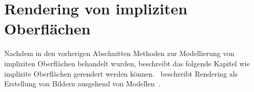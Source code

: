 
\section{Rendering von impliziten Oberflächen}
\label{sec:rendering_implicit_surfaces}

Nachdem in den vorherigen Abschnitten Methoden zur Modellierung von
impliziten Oberflächen behandelt wurden, beschreibt das folgende Kapitel
wie implizite Oberflächen gerendert werden
können.~\citeauthor{foley_computer_1996} beschreibt Rendering als
Erstellung von Bildern ausgehend von Modellen~\parencite[S.
606]{foley_computer_1996}.




